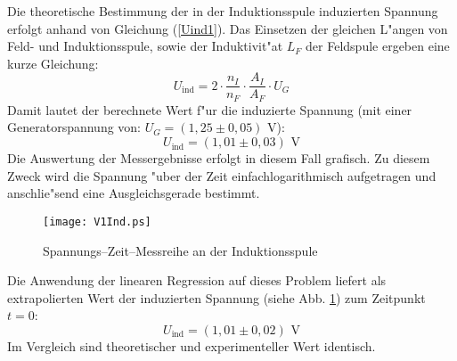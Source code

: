 \documentclass[a4paper,10pt]{article}
\begin{document}
Die theoretische Bestimmung der in der Induktionsspule induzierten Spannung erfolgt anhand von Gleichung (\ref{Uind1}). Das Einsetzen der gleichen L"angen von Feld- und Induktionsspule, sowie der Induktivit"at $L_F$ der Feldspule ergeben eine kurze Gleichung:
\begin{equation}
U_{\text{ind}} = 2 \cdot \frac{n_I}{n_F} \cdot \frac{A_I}{A_F} \cdot U_G
\end{equation} 
Damit lautet der berechnete Wert f"ur die induzierte Spannung (mit einer Generatorspannung von: $U_G = (1,25 \pm 0,05) \text{ V}$):
\begin{equation}
U_{\text{ind}} = (1,01 \pm 0,03) \text{ V}
\end{equation}
Die Auswertung der Messergebnisse erfolgt in diesem Fall grafisch. Zu diesem Zweck wird die Spannung "uber der Zeit einfachlogarithmisch aufgetragen und anschlie"send eine Ausgleichsgerade bestimmt.
\begin{figure}[htb]
	\centering
	     \texttt{[image: V1Ind.ps]}
	     \caption{Spannungs--Zeit--Messreihe an der Induktionsspule}
       \label{fig:1}
\end{figure}
Die Anwendung der linearen Regression auf dieses Problem liefert als extrapolierten Wert der induzierten Spannung (siehe Abb. \ref{fig:1}) zum Zeitpunkt $t=0$:
\begin{equation}
U_{\text{ind}} = (1,01 \pm 0,02) \text{ V}
\end{equation}
Im Vergleich sind theoretischer und experimenteller Wert identisch.
\newpage
\end{document}
